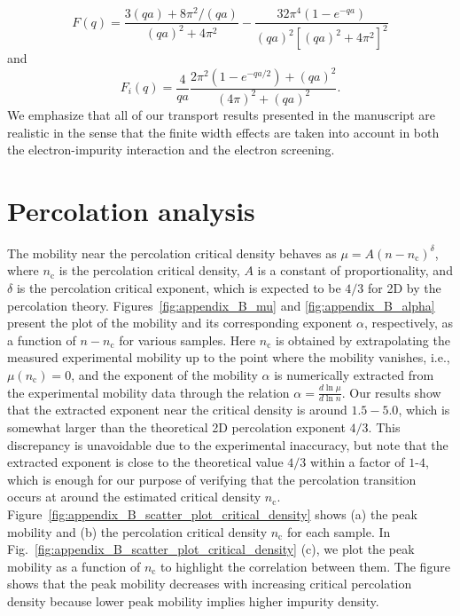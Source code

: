 \documentclass[aps,prmaterials,twocolumn,superscriptaddress,longbibliography]{revtex4-2}
\begin{document}
\begin{equation}
    F(q)=\frac{ 3(qa) + 8\pi^2/(qa)}{(qa)^2 + 4\pi^2} - \frac{32\pi^4(1-e^{-qa})}{(qa)^2[(qa)^2 + 4\pi^2 ]^2}
\end{equation}
and
\begin{equation}
    F_i(q)= \frac{4}{qa} \frac{ 2\pi^2(1-e^{-qa/2}) + (qa)^2 }{ (4\pi)^2 + (qa)^2 }.
\end{equation}
We emphasize that all of our transport results presented in the manuscript are realistic in the sense that the finite width effects are taken into account in both the electron-impurity interaction and the electron screening.
 
\section{Percolation analysis}\label{app:B}
The mobility near the percolation critical density behaves as $\mu=A(n-n_\mathrm{c})^\delta$, where $n_\mathrm{c}$ is the percolation critical density, $A$ is a constant of proportionality, and $\delta$ is the percolation critical exponent, which is expected to be $4/3$ for 2D by the percolation theory.
Figures~\ref{fig:appendix_B_mu} and \ref{fig:appendix_B_alpha} present the plot of the mobility and its corresponding exponent $\alpha$, respectively, as a function of $n-n_\mathrm{c}$ for various samples. Here $n_\mathrm{c}$ is obtained by extrapolating the measured experimental mobility up to the point where the mobility vanishes, i.e., $\mu(n_\mathrm{c})=0$, and the exponent of the mobility $\alpha$ is numerically extracted from the experimental mobility data through the relation $\alpha = \frac{d\ln{\mu}}{d\ln{n}}$. Our results show that the extracted exponent near the critical density is around $1.5-5.0$, which is somewhat larger than the theoretical 2D percolation exponent $4/3$. This discrepancy is unavoidable due to the experimental inaccuracy, but note that the extracted exponent is close to the theoretical value $4/3$ within a factor of $1$-$4$, which is enough for our purpose of verifying that the percolation transition occurs at around the estimated critical density $n_\mathrm{c}$.
Figure~\ref{fig:appendix_B_scatter_plot_critical_density} shows (a) the peak mobility and (b) the percolation critical density $n_\mathrm{c}$ for each sample. In Fig.~\ref{fig:appendix_B_scatter_plot_critical_density} (c), we plot the peak mobility as a function of $n_\mathrm{c}$ to highlight the correlation between them. The figure shows that the peak mobility decreases with increasing critical percolation density because lower peak mobility implies higher impurity density. 
\end{document}
